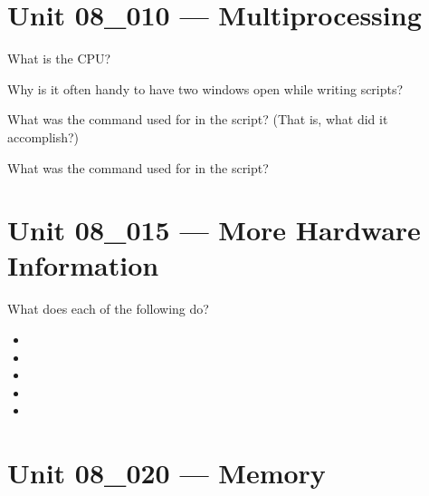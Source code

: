 \documentclass[letterpaper,12pt]{exam}
\newcommand{\unit}{Unit 08}
\begin{document}
\begin {questions}

\section*{\unit\_010 --- Multiprocessing} %

\begin{samepage}
	\question What is the CPU?
	\vspace{5mm}
\end{samepage}

\begin{samepage}
\question Why is it often handy to have two windows open while writing scripts? 
\vspace{5mm}
\end{samepage}

\begin{samepage}
\question What was the  command used for in the script? (That is, what did it accomplish?)
\vspace{5mm}
\end{samepage}


\begin{samepage}
\question  What was the  command used for in the script?
\vspace{5mm}
\end{samepage}

\section*{\unit\_015 --- More Hardware Information}

\begin{samepage}
\question What does each of the following do? 
\begin{itemize}
\item {}
\vspace{5mm}
\item {}
\vspace{5mm}
\item {}
\vspace{5mm}
\item {}
\vspace{5mm}
\item {}
\vspace{5mm}
\end{itemize}
\end{samepage}

\section*{\unit\_020 --- Memory}


\end{questions}
\end{document}
